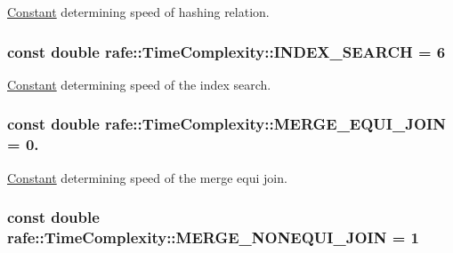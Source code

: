 \hyperlink{classrafe_1_1_constant}{Constant} determining speed of hashing relation. \hypertarget{classrafe_1_1_time_complexity_aa0e26e3055e00e90b601428b0ad74e7e}{
\subsubsection[{I\+N\+D\+E\+X\+\_\+\+S\+E\+A\+R\+C\+H}]{\setlength{\rightskip}{0pt plus 5cm}const double rafe\+::\+Time\+Complexity\+::\+I\+N\+D\+E\+X\+\_\+\+S\+E\+A\+R\+C\+H = 6\hspace{0.3cm}{\ttfamily [static]}}}\label{classrafe_1_1_time_complexity_aa0e26e3055e00e90b601428b0ad74e7e}
\hyperlink{classrafe_1_1_constant}{Constant} determining speed of the index search. \hypertarget{classrafe_1_1_time_complexity_a68dde40140a8dfc63a2b74308c6884cd}{
\subsubsection[{M\+E\+R\+G\+E\+\_\+\+E\+Q\+U\+I\+\_\+\+J\+O\+I\+N}]{\setlength{\rightskip}{0pt plus 5cm}const double rafe\+::\+Time\+Complexity\+::\+M\+E\+R\+G\+E\+\_\+\+E\+Q\+U\+I\+\_\+\+J\+O\+I\+N = 0.\hspace{0.3cm}{\ttfamily [static]}}}\label{classrafe_1_1_time_complexity_a68dde40140a8dfc63a2b74308c6884cd}
\hyperlink{classrafe_1_1_constant}{Constant} determining speed of the merge equi join. \hypertarget{classrafe_1_1_time_complexity_aed73c88d72629bb341ed639edf5e255b}{
\subsubsection[{M\+E\+R\+G\+E\+\_\+\+N\+O\+N\+E\+Q\+U\+I\+\_\+\+J\+O\+I\+N}]{\setlength{\rightskip}{0pt plus 5cm}const double rafe\+::\+Time\+Complexity\+::\+M\+E\+R\+G\+E\+\_\+\+N\+O\+N\+E\+Q\+U\+I\+\_\+\+J\+O\+I\+N = 1\hspace{0.3cm}{\ttfamily [static]}}}\label{classrafe_1_1_time_complexity_aed73c88d72629bb341ed639edf5e255b}

